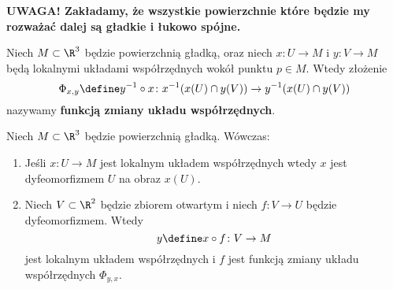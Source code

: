 \begin{frame}[<+->]

\begin{uwaga}
\textbf{UWAGA! Zakładamy, że wszystkie powierzchnie które będzie my rozważać 
dalej są gładkie i łukowo spójne.}
\end{uwaga}

\end{frame}
\begin{frame}[<+->]

\begin{definicja}
Niech $M\subset\R^3$ będzie powierzchnią gładką, oraz niech $x\colon U\to M$ i 
$y\colon V\to M$ będą lokalnymi układami współrzędnych wokół punktu $p\in M$. 
Wtedy złożenie 
\[\Phi_{x,y}\define y^{-1}\circ x\colon x^{-1}(x(U)\cap y(V))\to y^{-1}(x(U)\cap 
y(V))\]
nazywamy \textbf{funkcją zmiany układu współrzędnych}.

\end{definicja}
\end{frame}
\begin{frame}[<+->]
\begin{center}

\end{center}

\end{frame}
\begin{frame}


\begin{lemat}\label{lem:chart_loc_bij}
Niech $M\subset \R^3$ będzie powierzchnią gładką. Wówczas:
\begin{enumerate}[<+->]
\item Jeśli $x\colon U\to M$ jest lokalnym układem współrzędnych wtedy $x$ jest 
dyfeomorfizmem $U$ na obraz $x(U)$. 
\item Niech $V\subset \R^2$ będzie zbiorem otwartym i niech $f\colon V\to U$ 
będzie dyfeomorfizmem. Wtedy \[y\define x\circ f\colon V\to M\] jest lokalnym 
układem współrzędnych i $f$ jest funkcją zmiany układu współrzędnych 
$\Phi_{y,x}$.
\end{enumerate}
\end{lemat}

\end{frame}
